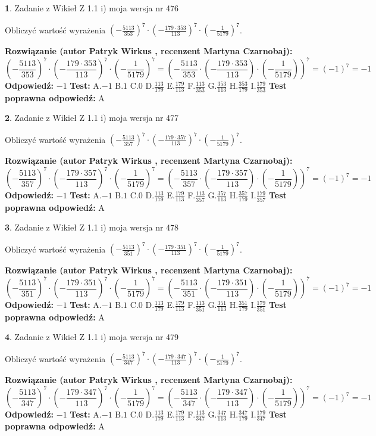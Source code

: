 \documentclass[12pt, a4paper]{article}
\theoremstyle{definition} %
\newtheorem{zad}{}
\newcommand{\zadStart}[1]{\begin{zad}#1\newline}
\newcommand{\zadStop}{\end{zad}}
\newcommand{\rozwStart}[2]{\noindent \textbf{Rozwiązanie (autor #1 , recenzent #2): }\newline}
\newcommand{\rozwStop}{\newline}
\newcommand{\odpStart}{\noindent \textbf{Odpowiedź:}\newline}
\newcommand{\odpStop}{\newline}
\newcommand{\testStart}{\noindent \textbf{Test:}\newline}
\newcommand{\testStop}{\newline}
\newcommand{\kluczStart}{\noindent \textbf{Test poprawna odpowiedź:}\newline}
\newcommand{\kluczStop}{\newline}
\begin{document}
\zadStart{Zadanie z Wikieł Z 1.1 i) moja wersja nr 476}

Obliczyć wartość wyrażenia $(-\frac{5113}{353})^{7} \cdot (-\frac{179 \cdot 353}{113})^{7} \cdot (-\frac{1}{5179})^{7}$.
\zadStop
\rozwStart{Patryk Wirkus}{Martyna Czarnobaj}
$$(-\frac{5113}{353})^{7} \cdot (-\frac{179 \cdot 353}{113})^{7} \cdot (-\frac{1}{5179})^{7} = (-\frac{5113}{353} \cdot (-\frac{179 \cdot 353}{113}) \cdot (-\frac{1}{5179}))^{7} = (-1)^{7} = -1$$
\rozwStop
\odpStart
$-1$
\odpStop
\testStart
A.$-1$ B.$1$ C.$0$ D.$\frac{113}{179}$ E.$\frac{179}{113}$
F.$\frac{113}{353}$ G.$\frac{353}{113}$
H.$\frac{353}{179}$
I.$\frac{179}{353}$
\testStop
\kluczStart
A
\kluczStop



\zadStart{Zadanie z Wikieł Z 1.1 i) moja wersja nr 477}

Obliczyć wartość wyrażenia $(-\frac{5113}{357})^{7} \cdot (-\frac{179 \cdot 357}{113})^{7} \cdot (-\frac{1}{5179})^{7}$.
\zadStop
\rozwStart{Patryk Wirkus}{Martyna Czarnobaj}
$$(-\frac{5113}{357})^{7} \cdot (-\frac{179 \cdot 357}{113})^{7} \cdot (-\frac{1}{5179})^{7} = (-\frac{5113}{357} \cdot (-\frac{179 \cdot 357}{113}) \cdot (-\frac{1}{5179}))^{7} = (-1)^{7} = -1$$
\rozwStop
\odpStart
$-1$
\odpStop
\testStart
A.$-1$ B.$1$ C.$0$ D.$\frac{113}{179}$ E.$\frac{179}{113}$
F.$\frac{113}{357}$ G.$\frac{357}{113}$
H.$\frac{357}{179}$
I.$\frac{179}{357}$
\testStop
\kluczStart
A
\kluczStop



\zadStart{Zadanie z Wikieł Z 1.1 i) moja wersja nr 478}

Obliczyć wartość wyrażenia $(-\frac{5113}{351})^{7} \cdot (-\frac{179 \cdot 351}{113})^{7} \cdot (-\frac{1}{5179})^{7}$.
\zadStop
\rozwStart{Patryk Wirkus}{Martyna Czarnobaj}
$$(-\frac{5113}{351})^{7} \cdot (-\frac{179 \cdot 351}{113})^{7} \cdot (-\frac{1}{5179})^{7} = (-\frac{5113}{351} \cdot (-\frac{179 \cdot 351}{113}) \cdot (-\frac{1}{5179}))^{7} = (-1)^{7} = -1$$
\rozwStop
\odpStart
$-1$
\odpStop
\testStart
A.$-1$ B.$1$ C.$0$ D.$\frac{113}{179}$ E.$\frac{179}{113}$
F.$\frac{113}{351}$ G.$\frac{351}{113}$
H.$\frac{351}{179}$
I.$\frac{179}{351}$
\testStop
\kluczStart
A
\kluczStop



\zadStart{Zadanie z Wikieł Z 1.1 i) moja wersja nr 479}

Obliczyć wartość wyrażenia $(-\frac{5113}{347})^{7} \cdot (-\frac{179 \cdot 347}{113})^{7} \cdot (-\frac{1}{5179})^{7}$.
\zadStop
\rozwStart{Patryk Wirkus}{Martyna Czarnobaj}
$$(-\frac{5113}{347})^{7} \cdot (-\frac{179 \cdot 347}{113})^{7} \cdot (-\frac{1}{5179})^{7} = (-\frac{5113}{347} \cdot (-\frac{179 \cdot 347}{113}) \cdot (-\frac{1}{5179}))^{7} = (-1)^{7} = -1$$
\rozwStop
\odpStart
$-1$
\odpStop
\testStart
A.$-1$ B.$1$ C.$0$ D.$\frac{113}{179}$ E.$\frac{179}{113}$
F.$\frac{113}{347}$ G.$\frac{347}{113}$
H.$\frac{347}{179}$
I.$\frac{179}{347}$
\testStop
\kluczStart
A
\kluczStop
\end{document}
